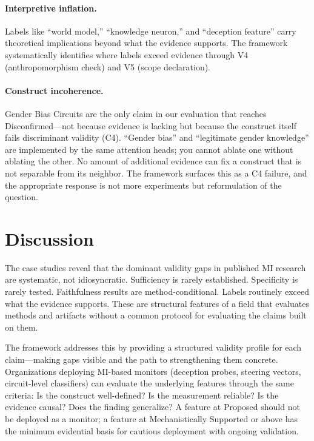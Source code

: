 \documentclass[10pt]{article}
\begin{document}
\paragraph{Interpretive inflation.} Labels like ``world model,'' ``knowledge neuron,'' and ``deception feature'' carry theoretical implications beyond what the evidence supports. The framework systematically identifies where labels exceed evidence through V4 (anthropomorphism check) and V5 (scope declaration).

\paragraph{Construct incoherence.} Gender Bias Circuits are the only claim in our evaluation that reaches Disconfirmed---not because evidence is lacking but because the construct itself fails discriminant validity (C4). ``Gender bias'' and ``legitimate gender knowledge'' are implemented by the same attention heads; you cannot ablate one without ablating the other. No amount of additional evidence can fix a construct that is not separable from its neighbor. The framework surfaces this as a C4 failure, and the appropriate response is not more experiments but reformulation of the question.

\section{Discussion}
\label{sec:discussion}

The case studies reveal that the dominant validity gaps in published MI research are systematic, not idiosyncratic. Sufficiency is rarely established. Specificity is rarely tested. Faithfulness results are method-conditional. Labels routinely exceed what the evidence supports. These are structural features of a field that evaluates methods and artifacts without a common protocol for evaluating the claims built on them.

The framework addresses this by providing a structured validity profile for each claim---making gaps visible and the path to strengthening them concrete. Organizations deploying MI-based monitors (deception probes, steering vectors, circuit-level classifiers) can evaluate the underlying features through the same criteria: Is the construct well-defined? Is the measurement reliable? Is the evidence causal? Does the finding generalize? A feature at Proposed should not be deployed as a monitor; a feature at Mechanistically Supported or above has the minimum evidential basis for cautious deployment with ongoing validation.
\end{document}
